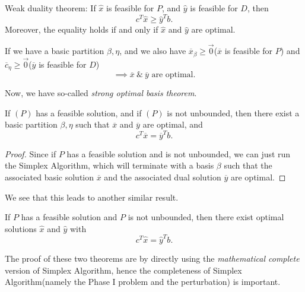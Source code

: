 \begin{prev}
	Weak duality theorem: If \(\hat{x}\) is feasible for \(P\), and \(\hat{y}\)
	is feasible for \(D\), then
	\[
		c^{T} \hat{x} \geq  \hat{y}^{T} b.
	\]
	Moreover, the equality holds if and only if \(\hat{x}\) and \(\hat{y}\) are optimal.
\end{prev}

\begin{theorem}
	If we have a basic partition \(\beta, \eta\), and we also have
	\(\overline{x}_{\beta}\geq  \vec{0}\)(\(\overline{x}\) is feasible for \(P\)) and \(\overline{c}_{\eta} \geq  \vec{0}\)(\(\overline{y}\) is feasible for \(D\))
	\[
		\implies \overline{x}\ \&\ \overline{y} \text{ are optimal}.
	\]
\end{theorem}

Now, we have so-called \emph{strong optimal basis theorem}.
\begin{theorem}
	If \((P)\) has a feasible solution, and if \((P)\) is not unbounded, then there exist a basic partition \(\beta, \eta\) such that
	\(\overline{x}\) and \(\overline{y}\) are optimal, and
	\[
		c^{T} \overline{x} = \overline{y}^{T} b.
	\]
\end{theorem}
\begin{proof}
	Since if \(P\) has a feasible solution and is not unbounded, we can just run the Simplex Algorithm, which will terminate with a basis \(\beta\) such
	that the associated basic solution \(\overline{x}\) and the associated dual solution \(\overline{y}\) are optimal.
\end{proof}

We see that this leads to another similar result.
\begin{theorem}
	\label{strong duality theorem}
	If \(P\) has a feasible solution and \(P\) is not unbounded, then there exist optimal solutions
	\(\hat{x}\) and \(\hat{y}\) with
	\[
		c^{T} \hat{x} = \hat{y}^{T} b.
	\]
\end{theorem}

\begin{note}
	The proof of these two theorems are by directly using the \emph{mathematical complete} version of Simplex Algorithm, hence the completeness of
	Simplex Algorithm(namely the Phase I problem and the perturbation) is important.
\end{note}

